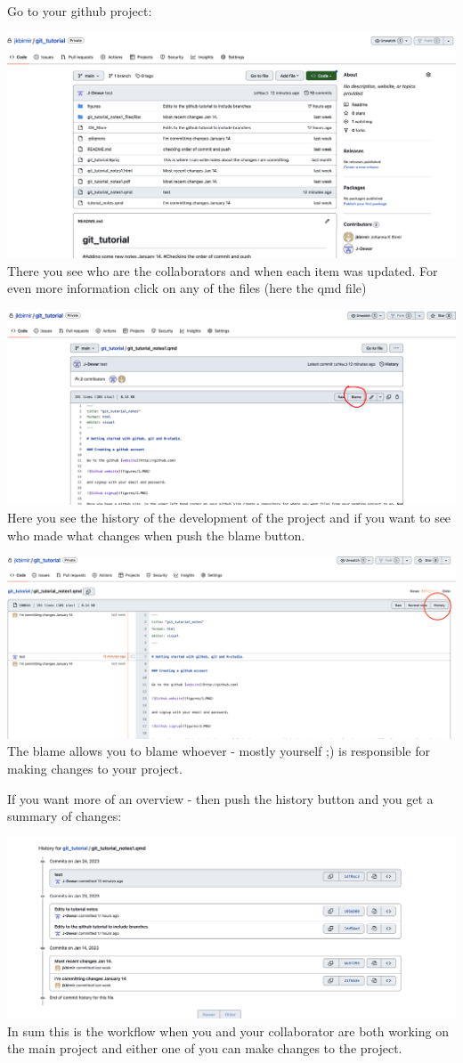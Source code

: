 \documentclass[
  letterpaper,
  DIV=11,
  numbers=noendperiod]{scrartcl}
\begin{document}
Go to your github project:

\includegraphics{figures/20.png} There you see who are the collaborators
and when each item was updated. For even more information click on any
of the files (here the qmd file)

\includegraphics{figures/21.png} Here you see the history of the
development of the project and if you want to see who made what changes
when push the blame button.

\includegraphics{figures/22.png} The blame allows you to blame whoever -
mostly yourself ;) is responsible for making changes to your project.

If you want more of an overview - then push the history button and you
get a summary of changes:

\includegraphics{figures/23.png} In sum this is the workflow when you
and your collaborator are both working on the main project and either
one of you can make changes to the project.
\end{document}
